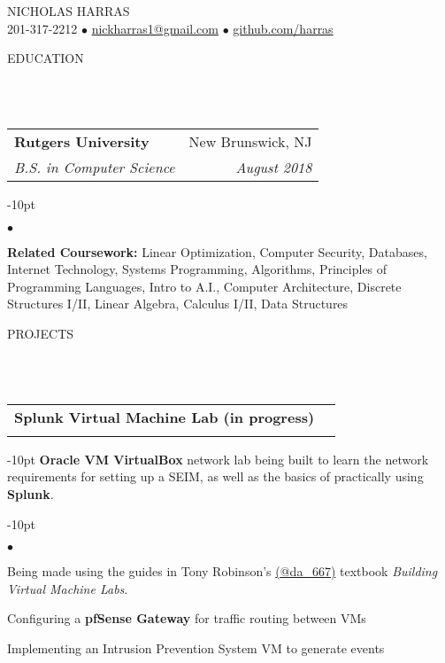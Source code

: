 \documentclass[12pt]{article}
\makeatletter
\newcommand{\mailto}[1]{
	\href{mailto:#1}{#1}
}
\newcommand{\contact}[2]{
	\vspace*{-8pt}
	\begin{center}
		{#1}\\ %
		#2
	\end{center}
	\vspace*{-12pt}
}
\newcommand{\header}[1]{
	\vspace*{12pt} %
	{\hspace*{-14pt}\vspace*{6pt} #1}
	\vspace*{-6pt} 
	\lineunder
}
\newcommand{\lineunder}{
	\vspace*{-8pt} \\ 
	\hspace*{-18pt} 
	\hrulefill \\
}
\newcommand{\subheading}[4]{
 	\vspace{5pt}
    	\begin{tabular*}{1.01\textwidth}
    		{l@{\extracolsep{\fill}}r}
      		\hspace{-16pt}\textbf{#1} & #2 \\
      		\hspace{-16pt}\textit{\small#3} & \textit{\small #4} \\
    	\end{tabular*}
    \vspace{-4pt}
}
\newenvironment{achievements}{
\begin{adjustwidth}{-10pt}{}
  \begin{list}{$\bullet$}{
  	\topsep 0pt \itemsep -4pt}}
  	{\vspace*{2pt}\end{list}
\end{adjustwidth}
}
\makeatother
\begin{document}
\small
\smallskip
\vspace*{-40pt}

\contact{\huge{N}\LARGE{ICHOLAS} \huge{H}\LARGE{ARRAS}}{201-317-2212 $\bullet$ \mailto{nickharras1@gmail.com} $\bullet$ \href{https://www.github.com/harras}{github.com/harras}}

\header{EDUCATION}

\subheading
	{Rutgers University}{New Brunswick, NJ}
	{B.S. in Computer Science}{August 2018}
	\begin{achievements}	
	\item{\bf Related Coursework:} Linear Optimization, Computer Security, Databases, Internet Technology, Systems Programming, Algorithms, Principles of Programming Languages, Intro to A.I., Computer Architecture, Discrete Structures I/II, Linear Algebra, Calculus I/II, Data Structures
	\end{achievements}


\header{PROJECTS}


\subheading{Splunk Virtual Machine Lab (in progress)}{}{}{}
	\vspace{-15pt}
	\begin{adjustwidth}{-10pt}{}
	\textbf{Oracle VM VirtualBox} network lab being built to learn the network requirements for setting up a SEIM, as well as the basics of practically using \textbf{Splunk}.
	\end{adjustwidth}
	\begin{achievements}
		\item Being made using the guides in Tony Robinson's \href{https://twitter.com/da_667}{(@da\_667)} textbook \textit{Building Virtual Machine Labs}.
		\item Configuring a \textbf{pfSense Gateway} for traffic routing between VMs
		\item Implementing an Intrusion Prevention System VM to generate events
	\end{achievements} 
\end{document}
